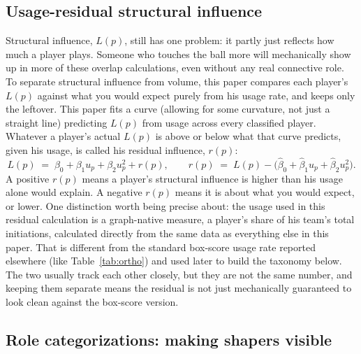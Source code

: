 \documentclass[11pt]{article}
\newcommand{\load}{\ensuremath{L}} %
\newcommand{\resid}{\ensuremath{r}} %
\begin{document}
\subsection{Usage-residual structural influence}
\label{sec:resid}

Structural influence, $\load(p)$, still has one problem: it partly just reflects how much a
player plays. Someone who touches the ball more will mechanically show up in more of these
overlap calculations, even without any real connective role. To separate structural influence
from volume, this paper compares each player's $\load(p)$ against what you would expect
purely from his usage rate, and keeps only the leftover.
This paper fits a curve (allowing for some curvature, not just a straight line) predicting
$\load(p)$ from usage across every classified player. Whatever a player's actual $\load(p)$
is above or below what that curve predicts, given his usage, is called his residual
influence, $\resid(p)$:
\begin{equation}
\label{eq:resid}
\load(p) \;=\; \beta_0+\beta_1 u_p+\beta_2 u_p^{2}+\resid(p),
\qquad
\resid(p) \;=\; \load(p)-\big(\hat\beta_0+\hat\beta_1 u_p+\hat\beta_2 u_p^{2}\big).
\end{equation}
A positive $\resid(p)$ means a player's structural influence is higher than his usage alone
would explain. A negative $\resid(p)$ means it is about what you would expect, or lower.
One distinction worth being precise about: the usage used in this residual calculation is a
graph-native measure, a player's share of his team's total initiations, calculated directly
from the same data as everything else in this paper. That is different from the standard
box-score usage rate reported elsewhere (like Table~\ref{tab:ortho}) and used later to build
the taxonomy below. The two usually track each other closely, but they are not the same
number, and keeping them separate means the residual is not just mechanically guaranteed to
look clean against the box-score version.

\subsection{Role categorizations: making shapers visible}
\label{sec:taxonomy}
\end{document}
